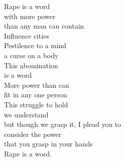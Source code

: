 Rape is a word\\
with more power\\
than any man can contain\\
Influence cities\\
Pestilence to a mind\\
a curse on a body\\
This abomination\\
is a word\\
More power than can\\
fit in any one person\\
This struggle to hold\\
we understand\\
but though we grasp
it, I plead you to\\
consider the power\\
that you grasp in your hands\\
Rape is a word.\\

